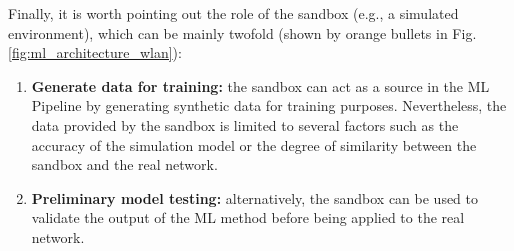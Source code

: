 \documentclass[journal]{IEEEtran}
\begin{document}
Finally, it is worth pointing out the role of the sandbox (e.g., a simulated environment), which can be mainly twofold (shown by orange bullets in Fig. \ref{fig:ml_architecture_wlan}):
\begin{enumerate}
	\item \textbf{Generate data for training:} the sandbox can act as a source in the ML Pipeline by generating synthetic data for training purposes. Nevertheless, the data provided by the sandbox is limited to several factors such as the accuracy of the simulation model or the degree of similarity between the sandbox and the real network. %
	\item \textbf{Preliminary model testing:} alternatively, the sandbox can be used to validate the output of the ML method before being applied to the real network.
\end{enumerate}

%
%

\end{document}
